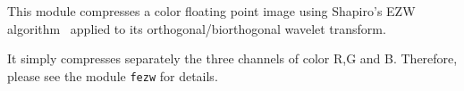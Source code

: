 This module compresses a color floating point image using 
Shapiro's EZW algorithm~\cite{shapiro:embedded} applied to 
its orthogonal/biorthogonal wavelet 
transform. 

It simply compresses separately the three channels of color R,G and B.
Therefore, please see the module \verb+fezw+ for details.

